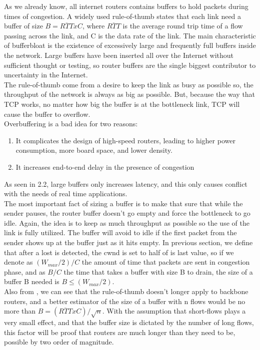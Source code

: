 
As we already know, all internet routers contains buffers to hold packets during times of congestion. A widely used rule-of-thumb states that each link need a buffer of size $B = \overline{RTT} x C $, where $\overline{RTT}$ is the average round trip time of a flow passing across the link, and C is the data rate of the link. The main characteristic of bufferbloat is the existence of excessively large and frequently full buffers inside the network. Large buffers have been inserted all over the Internet without sufficient thought or testing, so router buffers are the single biggest contributor to uncertainty in the Internet.\\

The rule-of-thumb come from a desire to keep the link as busy as possible so, the throughput of the network is always as big as possible. But, because the way that TCP works, no matter how big the buffer is at the bottleneck link, TCP will cause the buffer to overflow.\\ 

Overbuffering is a bad idea for two reasons:
\begin{enumerate}
\item It complicates the design of high-speed routers, leading to higher power consumption, more board space, and lower density.
\item It increases end-to-end delay in the presence of congestion
\end{enumerate}

As seen in 2.2, large buffers only increases latency, and this only causes conflict with the needs of real time applications.\\

The most important fact of sizing a buffer is to make that sure that while the sender pauses, the router buffer doesn't go empty and force the bottleneck to go idle. Again, the idea is to keep as much throughput as possible so the use of the link is fully utilized. The buffer will avoid to idle if the first packet from the sender shows up at the buffer just as it hits empty. In previous section, we define that after a lost is detected, the cwnd is set to half of is last value, so if we denote as $(W_{max} /2)/C$ the amount of time that packets are sent in congestion phase, and as $B/C$ the time that takes a buffer with size B to drain, the size of a buffer B needed is $B \leq (W_{max} /2)$.\\

Also from \cite{main:ref:1}, we can see that the rule-of-thumb doesn't longer apply to backbone routers, and a better estimator of the size of a buffer with n flows would be no more than $B = (\overline{RTT}xC)/\sqrt{n}$. With the assumption that short-flows plays a very small effect, and that the buffer size is dictated by the number of long flows, this factor will be proof that routers are much longer than they need to be, possible by two order of magnitude.
